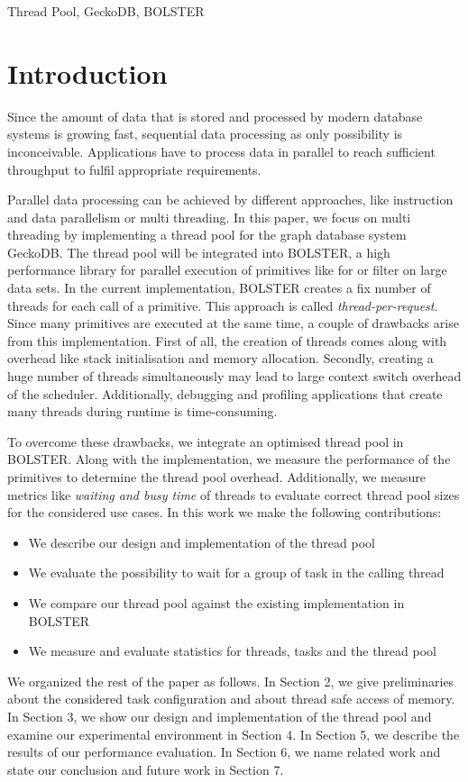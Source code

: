 \documentclass[conference]{IEEEtran}
\begin{document}
\begin{IEEEkeywords}
Thread Pool, GeckoDB, BOLSTER
\end{IEEEkeywords}

\section{Introduction}
Since the amount of data that is stored and processed by modern database systems is growing fast, sequential data processing as only possibility is inconceivable. Applications have to process data in parallel to reach sufficient throughput to fulfil appropriate requirements.

Parallel data processing can be achieved by different approaches, like instruction and data parallelism or multi threading. In this paper, we focus on multi threading by implementing a thread pool for the graph database system GeckoDB. The thread pool will be integrated into BOLSTER, a high performance library for parallel execution of primitives like for or filter on large data sets. In the current implementation, BOLSTER creates a fix number of threads for each call of a primitive. This approach is called \emph{thread-per-request}. Since many primitives are executed at the same time, a couple of drawbacks arise from this implementation.
First of all, the creation of threads comes along with overhead like stack initialisation and memory allocation. Secondly, creating a huge number of threads simultaneously may lead to large context switch overhead of the scheduler. Additionally, debugging and profiling applications that create many threads during runtime is 	time-consuming.

To overcome these drawbacks, we integrate an optimised thread pool in BOLSTER. Along with the implementation, we measure the performance of the primitives to determine the thread pool overhead. Additionally, we measure metrics like \emph{waiting and busy time} of threads to evaluate correct thread pool sizes for the considered use cases. In this work we make the following contributions:
\begin{itemize}
	\item We describe our design and implementation of the thread pool
	\item We evaluate the possibility to wait for a group of task in the calling thread
	\item We compare our thread pool against the existing implementation in BOLSTER
	\item We measure and evaluate statistics for threads, tasks and the thread pool
\end{itemize}
We organized the rest of the paper as follows. In Section 2, we give preliminaries about the considered task configuration and about thread safe access of memory. In Section 3, we show our design and implementation of the thread pool and examine our experimental environment in Section 4. In Section 5, we describe the results of our performance evaluation. In Section 6, we name related work and state our conclusion and future work in Section 7.
\end{document}
